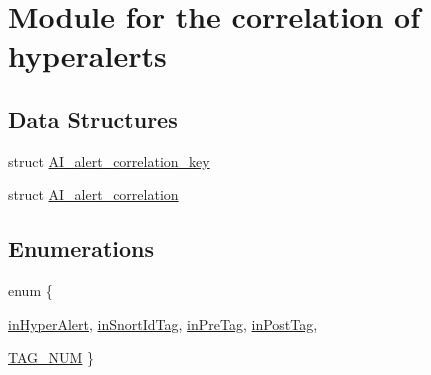 \hypertarget{group__correlation}{
\section{Module for the correlation of hyperalerts}
\label{group__correlation}
}
\subsection*{Data Structures}
\begin{DoxyCompactItemize}
\item 
struct \hyperlink{structAI__alert__correlation__key}{AI\_\-alert\_\-correlation\_\-key}
\item 
struct \hyperlink{structAI__alert__correlation}{AI\_\-alert\_\-correlation}
\end{DoxyCompactItemize}
\subsection*{Enumerations}
\begin{DoxyCompactItemize}
\item 
enum \{ \par
\hyperlink{group__correlation_gga06fc87d81c62e9abb8790b6e5713c55ba0b3b5f651ab0c6355666ff7b1c778af8}{inHyperAlert}, 
\hyperlink{group__correlation_gga06fc87d81c62e9abb8790b6e5713c55ba52d913c46f650f89a5da3ff4bfb7a45d}{inSnortIdTag}, 
\hyperlink{group__correlation_gga06fc87d81c62e9abb8790b6e5713c55ba828f2ec4acb20bae9b9c9fb0c5e0881f}{inPreTag}, 
\hyperlink{group__correlation_gga06fc87d81c62e9abb8790b6e5713c55baf6430d8e5b9791cca74ec3b325a8339f}{inPostTag}, 
\par
\hyperlink{group__correlation_gga06fc87d81c62e9abb8790b6e5713c55ba551d1861515058fbfe34955d4170ae67}{TAG\_\-NUM}
 \}
\end{DoxyCompactItemize}
